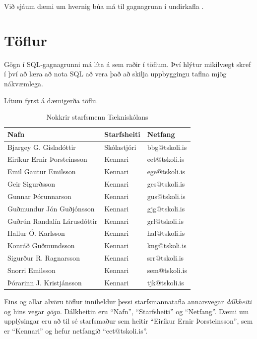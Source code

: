 Við sjáum dæmi um hvernig búa má til gagnagrunn í undirkafla .
\section{Töflur}
Gögn í SQL-gagnagrunni má líta á sem raðir í töflum. Því hlýtur mikilvægt skref í því að læra að nota SQL að vera það að skilja uppbyggingu taflna mjög nákvæmlega.

Lítum fyrst á dæmigerða töflu.

\begin{table}
\centering
\caption{Nokkrir starfsmenn Tækniskólans}
\label{tafla:starfsmenn_ts}
\begin{tabular}{lll}
\toprule
Nafn&Starfsheiti&Netfang\\
\midrule
Bjargey G. Gísladóttir&Skólastjóri&bbg@tskoli.is\\
Eiríkur Ernir Þorsteinsson&Kennari&eet@tskoli.is\\
Emil Gautur Emilsson&Kennari&ege@tskoli.is\\
Geir Sigurðsson&Kennari&ges@tskoli.is\\
Gunnar Þórunnarson&Kennari&gus@tskoli.is\\
Guðmundur Jón Guðjónsson&Kennari&gjg@tskoli.is\\
Guðrún Randalín Lárusdóttir&Kennari&grl@tskoli.is\\
Hallur Ó. Karlsson&Kennari&hal@tskoli.is\\
Konráð Guðmundsson&Kennari&kng@tskoli.is\\
Sigurður R. Ragnarsson&Kennari&srr@tskoli.is\\
Snorri Emilsson&Kennari&sem@tskoli.is\\
Þórarinn J. Kristjánsson&Kennari&tjk@tskoli.is\\
\bottomrule
\end{tabular}
\end{table}
Eins og allar alvöru töflur inniheldur þessi starfsmannatafla annarsvegar \emph{dálkheiti} og hins vegar \emph{gögn}. Dálkheitin eru ``Nafn'', ``Starfsheiti'' og ``Netfang''. Dæmi um upplýsingar eru að til sé starfsmaður sem heitir ``Eiríkur Ernir Þorsteinsson'', sem er ``Kennari'' og hefur netfangið ``eet@tskoli.is''. 

